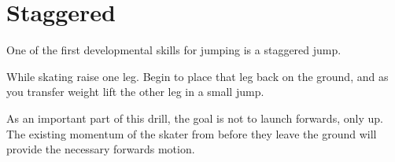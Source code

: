 \section{Staggered}
\label{sec:jumping/staggered}

One of the first developmental skills for jumping is a staggered jump. 

While skating raise one leg.
Begin to place that leg back on the ground, and as you transfer weight lift the other leg in a small jump.
    

As an important part of this drill, the goal is not to launch forwards, only up. 
The existing momentum of the skater from before they leave the ground will provide the necessary forwards motion.    
